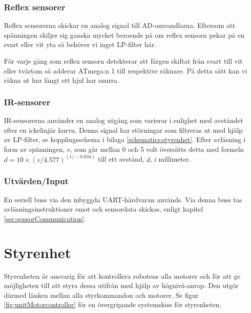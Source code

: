 \documentclass[a4paper,11pt]{article}
\begin{document}
\subsubsection{Reflex sensorer}
Reflex sensorerna skickar en analog signal till AD-omvandlarna. Eftersom att spänningen skiljer sig ganska mycket beroende på om reflex sensorn pekar på en svart eller vit yta så behöver vi inget LP-filter här.

För varje gång som reflex sensorn detekterar att färgen skiftat från svart till vit eller tvärtom så adderar ATmega:n 1 till respektive räknare. På detta sätt kan vi räkna ut hur långt ett hjul har snurra.

\subsubsection{IR-sensorer}
\label{ssec:ir_interface}
IR-sensorerna använder en analog utgång som varierar i enlighet med avståndet efter en ickelinjär kurva. Denna signal har störningar som filtreras ut med hjälp av LP-filter, se kopplingsschema i bilaga \ref{schematics:styrenhet}. Efter avläsning i form av spänningen, $v$, som går mellan 0 och 5 volt översätts detta med formeln $d = 10 \times (v/4.577) ^{(1/-0.634)}$ till ett avstånd, $d$, i millimeter.

\subsubsection{Utvärden/Input}
En seriell buss via den inbyggda UART-hårdvaran används. Via denna buss tas avläsningsinstruktioner emot och sensordata skickas, enligt kapitel \ref{sec:sensorCommunication}.

\clearpage
\section{Styrenhet} \label{sec:system2}
Styrenheten är ansvarig för att kontrollera robotens alla motorer och för att ge möjligheten till att styra dessa utifrån med hjälp av högnivå-anrop. Den utgör därmed länken mellan alla styrkommandon och motorer. Se figur \ref{fig:unitMotorcontroller} för en övergripande systemskiss för styrenheten.
\end{document}
